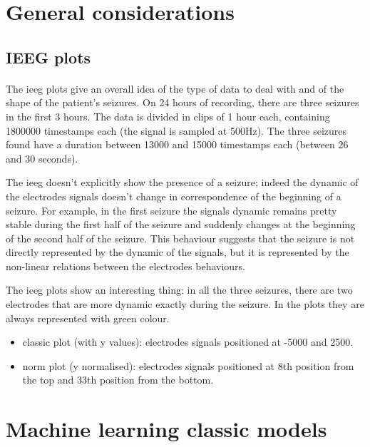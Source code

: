 

\section{General considerations}

\subsection{IEEG plots}
\paragraph{} The ieeg plots give an overall idea of the type of data to deal with and of the shape of the patient's seizures. On 24 hours of recording, there are three seizures in the first 3 hours. The data is divided in clips of 1 hour each, containing 1800000 timestamps each (the signal is sampled at 500Hz). The three seizures found have a duration between 13000 and 15000 timestamps each (between 26 and 30 seconds).

The ieeg doesn't explicitly show the presence of a seizure; indeed the dynamic of the electrodes signals doesn't change in correspondence of the beginning of a seizure. For example, in the first seizure the signals dynamic remains pretty stable during the first half of the seizure and suddenly changes at the beginning of the second half of the seizure. This behaviour suggests that the seizure is not directly represented by the dynamic of the signals, but it is represented by the non-linear relations between the electrodes behaviours.

The ieeg plots show an interesting thing: in all the three seizures, there are two electrodes that are more dynamic exactly during the seizure. In the plots they are always represented with green colour.
\begin{itemize}
    \item classic plot (with y values): electrodes signals positioned at -5000 and 2500.
    \item norm plot (y normalised): electrodes signals positioned at 8th position from the top and 33th position from the bottom.
\end{itemize}


\section{Machine learning classic models}

